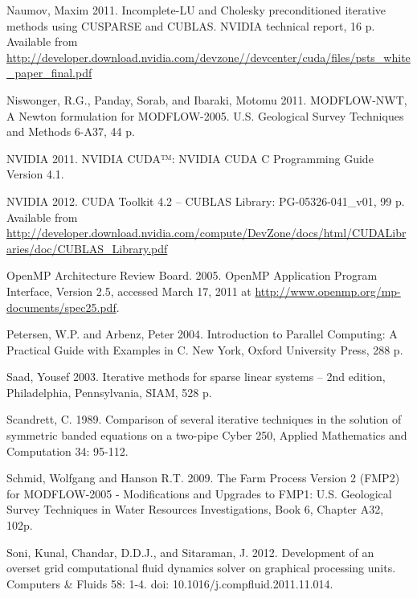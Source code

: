 \documentclass[12pt]{article}
\begin{document}
\begin{description}
\item \color{blue} Naumov, Maxim 2011. Incomplete-LU and Cholesky preconditioned iterative methods using CUSPARSE and CUBLAS. NVIDIA technical report, 16 p. Available from \url{http://developer.download.nvidia.com/devzone//devcenter/cuda/files/psts_white_paper_final.pdf}\color{black}

\item Niswonger, R.G., Panday, Sorab, and Ibaraki, Motomu 2011. MODFLOW-NWT, A Newton formulation for MODFLOW-2005. U.S. Geological Survey Techniques and Methods 6-A37, 44 p.

\item NVIDIA 2011. NVIDIA CUDA™: NVIDIA CUDA C Programming Guide Version 4.1.

\item \color{cyan} NVIDIA 2012. CUDA Toolkit 4.2 -- CUBLAS Library: PG-05326-041\_v01, 99 p. Available from \url{http://developer.download.nvidia.com/compute/DevZone/docs/html/CUDALibraries/doc/CUBLAS_Library.pdf}  \color{black}

\item OpenMP Architecture Review Board. 2005. OpenMP Application Program Interface, Version 2.5, accessed March 17, 2011 at \url{http://www.openmp.org/mp-documents/spec25.pdf}.

\item Petersen, W.P. and Arbenz, Peter 2004. Introduction to Parallel Computing: A Practical Guide with Examples in C. New York, Oxford University Press, 288 p.

\item Saad, Yousef 2003. Iterative methods for sparse linear systems – 2nd edition, Philadelphia, Pennsylvania, SIAM, 528 p.

\item Scandrett, C. 1989. Comparison of several iterative techniques in the solution of symmetric banded equations on a two-pipe Cyber 250, Applied Mathematics and Computation 34: 95-112.

\item \color{cyan}Schmid, Wolfgang and Hanson R.T. 2009. The Farm Process Version 2 (FMP2) for MODFLOW-2005 - Modifications and Upgrades to FMP1: U.S. Geological Survey Techniques in Water Resources Investigations, Book 6, Chapter A32, 102p.\color{black}

\item Soni, Kunal, Chandar, D.D.J., and Sitaraman, J. 2012. Development of an overset grid computational fluid dynamics solver on graphical processing units. Computers \& Fluids 58: 1-4. doi: 10.1016/j.compfluid.2011.11.014.


\end{description}
\end{document}

